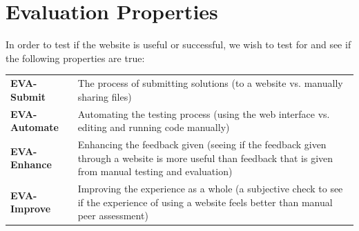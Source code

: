 \documentclass[a4paper,11pt]{report}
\begin{document}
\section{Evaluation Properties}
In order to test if the website is useful or successful, we wish to test for and see if the following properties are true:\\
\begin{tabularx}{\textwidth}{lX}
 \textbf{EVA-Submit} & The process of submitting solutions (to a website vs. manually sharing files)\\
 \textbf{EVA-Automate} & Automating the testing process (using the web interface vs. editing and running code manually)\\
 \textbf{EVA-Enhance} & Enhancing the feedback given (seeing if the feedback given through a website is more useful than feedback that is given from manual testing and evaluation)\\
 \textbf{EVA-Improve} & Improving the experience as a whole (a subjective check to see if the experience of using a website feels better than manual peer assessment)\\
\end{tabularx}
\end{document}
